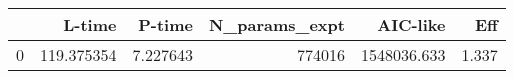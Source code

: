 \begin{tabular}{lrrrrr}
\toprule
{} &      L-time &    P-time &  N\_params\_expt &     AIC-like &    Eff \\
\midrule
0 &  119.375354 &  7.227643 &         774016 &  1548036.633 &  1.337 \\
\bottomrule
\end{tabular}

